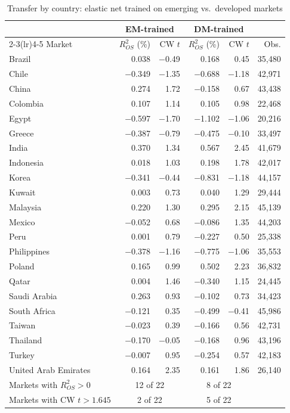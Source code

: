 \begin{table}[!ht]
\centering\small
\caption{Transfer by country: elastic net trained on emerging vs.\ developed markets}
\label{tab:country}
\begin{tabular}{lrrrrr}
\toprule
 & \multicolumn{2}{c}{EM-trained} & \multicolumn{2}{c}{DM-trained} & \\
\cmidrule(lr){2-3}\cmidrule(lr){4-5}
Market & $R^2_{OS}$ (\%) & CW $t$ & $R^2_{OS}$ (\%) & CW $t$ & Obs. \\
\midrule
Brazil & 0.038 & $-$0.49 & 0.168 & 0.45 & 35,480 \\
Chile & $-$0.349 & $-$1.35 & $-$0.688 & $-$1.18 & 42,971 \\
China & 0.274 & 1.72 & $-$0.158 & 0.67 & 43,438 \\
Colombia & 0.107 & 1.14 & 0.105 & 0.98 & 22,468 \\
Egypt & $-$0.597 & $-$1.70 & $-$1.102 & $-$1.06 & 20,216 \\
Greece & $-$0.387 & $-$0.79 & $-$0.475 & $-$0.10 & 33,497 \\
India & 0.370 & 1.34 & 0.567 & 2.45 & 41,679 \\
Indonesia & 0.018 & 1.03 & 0.198 & 1.78 & 42,017 \\
Korea & $-$0.341 & $-$0.44 & $-$0.831 & $-$1.18 & 44,157 \\
Kuwait & 0.003 & 0.73 & 0.040 & 1.29 & 29,444 \\
Malaysia & 0.220 & 1.30 & 0.295 & 2.15 & 45,139 \\
Mexico & $-$0.052 & 0.68 & $-$0.086 & 1.35 & 44,203 \\
Peru & 0.001 & 0.79 & $-$0.227 & 0.50 & 25,338 \\
Philippines & $-$0.378 & $-$1.16 & $-$0.775 & $-$1.06 & 35,553 \\
Poland & 0.165 & 0.99 & 0.502 & 2.23 & 36,832 \\
Qatar & 0.004 & 1.46 & $-$0.340 & 1.15 & 24,445 \\
Saudi Arabia & 0.263 & 0.93 & $-$0.102 & 0.73 & 34,423 \\
South Africa & $-$0.121 & 0.35 & $-$0.499 & $-$0.41 & 45,986 \\
Taiwan & $-$0.023 & 0.39 & $-$0.166 & 0.56 & 42,731 \\
Thailand & $-$0.170 & $-$0.05 & $-$0.168 & 0.96 & 43,196 \\
Turkey & $-$0.007 & 0.95 & $-$0.254 & 0.57 & 42,183 \\
United Arab Emirates & 0.164 & 2.35 & 0.161 & 1.86 & 26,140 \\
\midrule
Markets with $R^2_{OS}>0$ & \multicolumn{2}{c}{12 of 22} & \multicolumn{2}{c}{8 of 22} & \\
Markets with CW $t>1.645$ & \multicolumn{2}{c}{2 of 22} & \multicolumn{2}{c}{5 of 22} & \\
\bottomrule
\end{tabular}


\end{table}
